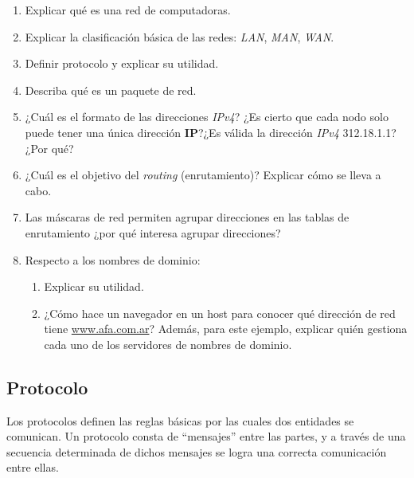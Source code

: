 \documentclass[12pt]{article}
\begin{document}
\begin{enumerate}

    \item Explicar qué es una red de computadoras.

    \item Explicar la clasificación básica de las redes: \emph{LAN},
        \emph{MAN}, \emph{WAN}.

    \item Definir protocolo y explicar su utilidad.

    \item Describa qué es un paquete de red.

    \item ¿Cuál es el formato de las direcciones \emph{IPv4}? ¿Es cierto que
        cada nodo solo puede tener una única dirección \textbf{IP}?¿Es válida
        la dirección \emph{IPv4} 312.18.1.1? ¿Por qué?

    \item ¿Cuál es el objetivo del \emph{routing} (enrutamiento)? Explicar
        cómo se lleva a cabo.

    \item Las máscaras de red permiten agrupar direcciones en las tablas de
        enrutamiento ¿por qué interesa agrupar direcciones?

    \item Respecto a los nombres de dominio:

    \begin{enumerate}

        \item Explicar su utilidad.

        \item ¿Cómo hace un navegador en un host para conocer qué dirección de
            red tiene \url{www.afa.com.ar}? Además, para este ejemplo,
            explicar quién gestiona cada uno de los servidores de nombres de
            dominio.

    \end{enumerate}

\end{enumerate}

\subsection*{Protocolo}

Los protocolos definen las reglas básicas por las cuales dos entidades se
comunican. Un protocolo consta de ``mensajes'' entre las partes, y a través de
una secuencia determinada de dichos mensajes se logra una correcta
comunicación entre ellas.
\end{document}

